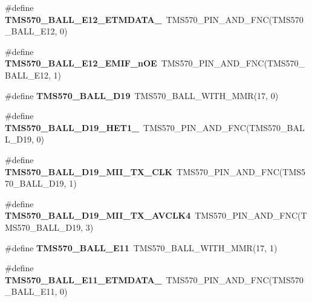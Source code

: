 \begin{DoxyCompactItemize}
\#define {\bfseries T\+M\+S570\+\_\+\+B\+A\+L\+L\+\_\+\+E12\+\_\+\+E\+T\+M\+D\+A\+T\+A\+\_}~T\+M\+S570\+\_\+\+P\+I\+N\+\_\+\+A\+N\+D\+\_\+\+F\+NC(T\+M\+S570\+\_\+\+B\+A\+L\+L\+\_\+\+E12, 0)
\item 
\mbox{\label{tms570ls3137zwt-pins_8h_a3cedd0c6c1bc54133a985dd766b00201}} 
\#define {\bfseries T\+M\+S570\+\_\+\+B\+A\+L\+L\+\_\+\+E12\+\_\+\+E\+M\+I\+F\+\_\+n\+OE}~T\+M\+S570\+\_\+\+P\+I\+N\+\_\+\+A\+N\+D\+\_\+\+F\+NC(T\+M\+S570\+\_\+\+B\+A\+L\+L\+\_\+\+E12, 1)
\item 
\mbox{\label{tms570ls3137zwt-pins_8h_acafd61778b9bd4921d52e8a3b4f421b2}} 
\#define {\bfseries T\+M\+S570\+\_\+\+B\+A\+L\+L\+\_\+\+D19}~T\+M\+S570\+\_\+\+B\+A\+L\+L\+\_\+\+W\+I\+T\+H\+\_\+\+M\+MR(17, 0)
\item 
\mbox{\label{tms570ls3137zwt-pins_8h_a0303ec847b041650fd18228aeb3fcdf0}} 
\#define {\bfseries T\+M\+S570\+\_\+\+B\+A\+L\+L\+\_\+\+D19\+\_\+\+H\+E\+T1\+\_}~T\+M\+S570\+\_\+\+P\+I\+N\+\_\+\+A\+N\+D\+\_\+\+F\+NC(T\+M\+S570\+\_\+\+B\+A\+L\+L\+\_\+\+D19, 0)
\item 
\mbox{\label{tms570ls3137zwt-pins_8h_ab0e13cd28671045790500416cb74e260}} 
\#define {\bfseries T\+M\+S570\+\_\+\+B\+A\+L\+L\+\_\+\+D19\+\_\+\+M\+I\+I\+\_\+\+T\+X\+\_\+\+C\+LK}~T\+M\+S570\+\_\+\+P\+I\+N\+\_\+\+A\+N\+D\+\_\+\+F\+NC(T\+M\+S570\+\_\+\+B\+A\+L\+L\+\_\+\+D19, 1)
\item 
\mbox{\label{tms570ls3137zwt-pins_8h_a5566e92ed09f72fda6aff72f9ccab70a}} 
\#define {\bfseries T\+M\+S570\+\_\+\+B\+A\+L\+L\+\_\+\+D19\+\_\+\+M\+I\+I\+\_\+\+T\+X\+\_\+\+A\+V\+C\+L\+K4}~T\+M\+S570\+\_\+\+P\+I\+N\+\_\+\+A\+N\+D\+\_\+\+F\+NC(T\+M\+S570\+\_\+\+B\+A\+L\+L\+\_\+\+D19, 3)
\item 
\mbox{\label{tms570ls3137zwt-pins_8h_a485e1f1cbef9b5ff955811eafc2c9197}} 
\#define {\bfseries T\+M\+S570\+\_\+\+B\+A\+L\+L\+\_\+\+E11}~T\+M\+S570\+\_\+\+B\+A\+L\+L\+\_\+\+W\+I\+T\+H\+\_\+\+M\+MR(17, 1)
\item 
\mbox{\label{tms570ls3137zwt-pins_8h_a9f3a19b198579e9d1be974c2033c5c37}} 
\#define {\bfseries T\+M\+S570\+\_\+\+B\+A\+L\+L\+\_\+\+E11\+\_\+\+E\+T\+M\+D\+A\+T\+A\+\_}~T\+M\+S570\+\_\+\+P\+I\+N\+\_\+\+A\+N\+D\+\_\+\+F\+NC(T\+M\+S570\+\_\+\+B\+A\+L\+L\+\_\+\+E11, 0)

\end{DoxyCompactItemize}
